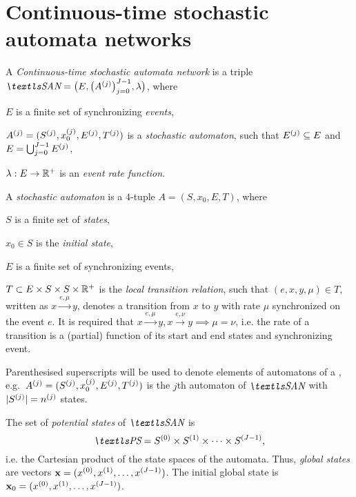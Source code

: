 \section{Continuous-time stochastic automata networks}

\begin{dfn}
  A \emph{Continuous-time stochastic automata network} is a triple
  $\SAN = \bigl(E, \bigl( \loc{A}{j} \bigr)_{j = 0}^{J - 1},
  \lambda\bigr)$, where
  \begin{asparaitem}
  \item $E$ is a finite set of synchronizing \emph{events},
  \item $A^{(j)} = (S^{(j)}, x_0^{(j)}, E^{(j)},
    T^{(j)})$ is a \emph{stochastic automaton}, such that
    $E^{(j)} \subseteq E$ and $E = \bigcup_{j = 0}^{J - 1}
    E^{(j)}$,
  \item $\lambda: E \to \mathbb{R}^{+}$ is an \emph{event rate function}.
  \end{asparaitem}
\end{dfn}

\begin{dfn}
  A \emph{stochastic automaton} is a $4$-tuple
  $A = (S, x_0, E, T)$, where
  \begin{asparaitem}
  \item $S$ is a finite set of \emph{states},
  \item $x_0 \in S$ is the \emph{initial state},
  \item $E$ is a finite set of synchronizing events,
  \item $T \subset E \times S \times S \times \mathbb{R}^{+}$ is the
    \emph{local transition relation}, such that
    $(e, x, y, \mu) \in T$, written as $x \xrightarrow{e, \mu} y$,
    denotes a transition from $x$ to $y$ with rate $\mu$ synchronized
    on the event $e$. It is required that $x \xrightarrow{e, \mu} y, x
    \xrightarrow{e, \nu} y \implies \mu = \nu$, i.e. the rate of a
    transition is a (partial) function of its start and end states and
    synchronizing event.
  \end{asparaitem}
\end{dfn}

Parenthesised superscripts will be used to denote elements of
automatons of a ,
e.g.~$A^{(j)} = (S^{(j)}, x_0^{(j)}, E^{(j)}, T^{(j)})$
is the $j$th automaton of $\SAN$ with
$\lvert S^{(j)} \rvert = n^{(j)}$ states.

The set of \emph{potential states} of $\SAN$ is
\begin{equation}
  \PS = \loc{S}{0} \times \loc{S}{1} \times \cdots \times \loc{S}{J -
    1} \text,
\end{equation}
i.e. the Cartesian product of the state spaces of the automata. Thus,
\emph{global states} are vectors $\bm{\mathrm{x}} = (x^{(0)}, x^{(1)},
\ldots, x^{(J - 1)})$. The initial global state is $\bm{\mathrm{x}}_0 =
(x^{(0)}, x^{(1)}, \ldots, x^{(J - 1)})$.

